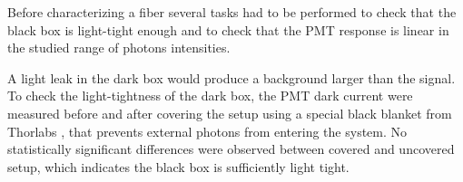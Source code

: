 
Before characterizing a fiber several tasks had to be performed to check that the black box is light-tight enough and to check that the PMT response is linear in the studied range of photons intensities.


A light leak in the dark box would produce a background larger than the signal. To check the light-tightness of the dark box, the PMT dark current were measured before and after covering the setup using a special black blanket from Thorlabs \cite{BlackBlancket}, that prevents external photons from entering the system. No statistically significant differences were observed between covered and uncovered setup, which indicates the black box is sufficiently light tight. 





